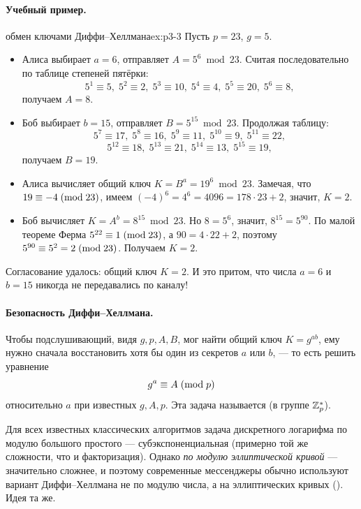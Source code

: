 \paragraph*{Учебный пример.}

\begin{example}{обмен ключами Диффи--Хеллмана}{ex:p3-3}
Пусть $p = 23$, $g = 5$.
\begin{itemize}
  \item Алиса выбирает $a = 6$, отправляет $A = 5^6 \bmod 23$. Считая последовательно по таблице степеней пятёрки:
  \[
  5^1\equiv 5,\;5^2\equiv 2,\;5^3\equiv 10,\;5^4\equiv 4,\;5^5\equiv 20,\;5^6\equiv 8,
  \]
  получаем $A = 8$.
  \item Боб выбирает $b = 15$, отправляет $B = 5^{15} \bmod 23$. Продолжая таблицу:
  \[
  5^7\equiv 17,\;5^8\equiv 16,\;5^9\equiv 11,\;5^{10}\equiv 9,\;5^{11}\equiv 22,
  \]
  \[
  5^{12}\equiv 18,\;5^{13}\equiv 21,\;5^{14}\equiv 13,\;5^{15}\equiv 19,
  \]
  получаем $B = 19$.
  \item Алиса вычисляет общий ключ $K = B^a = 19^6 \bmod 23$. Замечая, что $19 \equiv -4 \;(\mathrm{mod}\;23)$, имеем $(-4)^6 = 4^6 = 4096 = 178\cdot 23 + 2$, значит, $K = 2$.
  \item Боб вычисляет $K = A^b = 8^{15} \bmod 23$. Но $8 = 5^6$, значит, $8^{15} = 5^{90}$. По малой теореме Ферма $5^{22} \equiv 1 \;(\mathrm{mod}\;23)$, а $90 = 4\cdot 22 + 2$, поэтому $5^{90} \equiv 5^2 = 2 \;(\mathrm{mod}\;23)$. Получаем $K = 2$.
\end{itemize}

Согласование удалось: общий ключ $K = 2$. И это притом, что числа $a = 6$ и $b = 15$ никогда не передавались по каналу!
\end{example}

\paragraph*{Безопасность Диффи--Хеллмана.} Чтобы подслушивающий, видя $g, p, A, B$, мог найти общий ключ $K = g^{ab}$, ему нужно сначала восстановить хотя бы один из секретов $a$ или $b$, --- то есть решить уравнение
\[
g^a \equiv A \;(\mathrm{mod}\;p)
\]
относительно $a$ при известных $g, A, p$. Эта задача называется  (в группе $\mathbb{Z}_{p}^*$).

\begin{importantbox}
Для всех известных классических алгоритмов задача дискретного логарифма по модулю большого простого --- субэкспоненциальная (примерно той же сложности, что и факторизация). Однако \emph{по модулю эллиптической кривой} --- значительно сложнее, и поэтому современные мессенджеры обычно используют вариант Диффи--Хеллмана не по модулю числа, а на эллиптических кривых (). Идея та же.
\end{importantbox}

